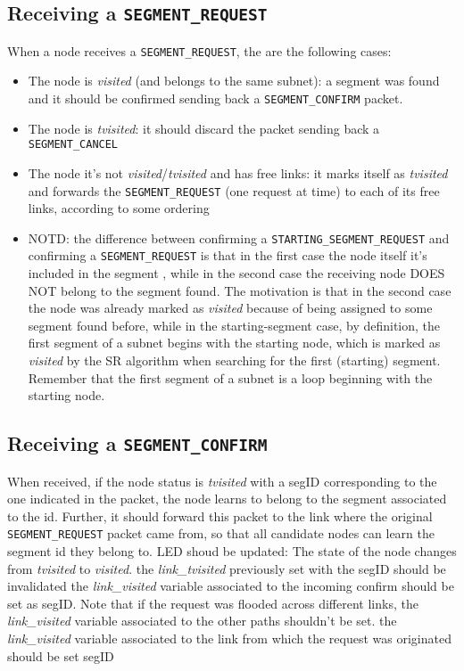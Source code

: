 \subsection{Receiving a \texttt{SEGMENT\_REQUEST}}
When a node receives a \texttt{SEGMENT\_REQUEST}, the are the following cases:

\begin{itemize}
\item The node is \emph{visited} (and belongs to the same subnet): a segment was
found and it should be confirmed sending back a \texttt{SEGMENT\_CONFIRM}
packet.  
\item The node is \emph{tvisited}: it should discard the packet sending
back a \texttt{SEGMENT\_CANCEL} 
\item The node it's not \emph{visited}/\emph{tvisited} and has free
links: it marks itself as \emph{tvisited} and forwards the \texttt{SEGMENT\_REQUEST}
(one request at time) to each of its free links, according to some
ordering
\item NOTD: the difference between confirming a \texttt{STARTING\_SEGMENT\_REQUEST}
and confirming a \texttt{SEGMENT\_REQUEST} is that in the first case the node
itself it's included in the segment , while in the second case the
receiving node DOES NOT belong to the segment found. The motivation is
that in the second case the node was already marked as \emph{visited} because
of being assigned to some segment found before, while in the
starting-segment case, by definition, the first segment of a subnet
begins with the starting node, which is marked as \emph{visited} by the SR
algorithm when searching for the first (starting) segment. Remember
that the first segment of a subnet is a loop beginning with the
starting node. 
\end{itemize}

\subsection{Receiving a \texttt{SEGMENT\_CONFIRM}}
When received, if the node status is \emph{tvisited} with a segID corresponding to the one indicated in
the packet, the node learns to belong to the segment associated to the
id. Further, it should forward this packet to the link where the
original \texttt{SEGMENT\_REQUEST} packet came from, so that all candidate nodes
can learn the segment id they belong to.  LED shoud be
updated: The state of the node changes from \emph{tvisited} to \emph{visited}.  the
\emph{link\_tvisited} previously set with the segID should be invalidated the
\emph{link\_visited} variable associated to the incoming confirm should be set
as segID. Note that if the request was flooded across different links,
the \emph{link\_visited} variable associated to the other paths shouldn’t be
set.  the \emph{link\_visited} variable associated to the link from which the
request was originated should be set segID

